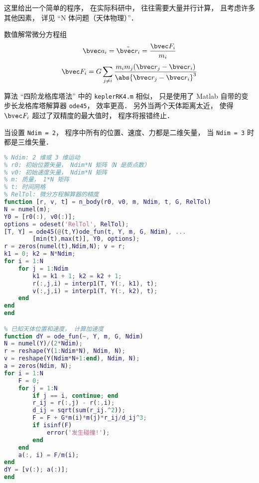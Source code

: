 
\begin{issues}
\issueDraft
\end{issues}


这里给出一个简单的程序， 在实际科研中， 往往需要大量并行计算， 且考虑许多其他因素， 详见 “N 体问题（天体物理）”．

数值解常微分方程组
\begin{equation}
\bvec a_i = \ddot{\bvec r_i} = \frac{\bvec F_i}{m_i}
\end{equation}
\begin{equation}
\bvec F_i = G\sum_{j\ne i} \frac{m_i m_j(\bvec r_j - \bvec r_i)}{\abs{\bvec r_j - \bvec r_i}^3}
\end{equation}

算法 “四阶龙格库塔法” 中的 \verb|keplerRK4.m| 相似， 只是使用了 Matlab 自带的变步长龙格库塔解算器 \verb|ode45|， 效率更高． 另外当两个天体距离太近， 使得 $\bvec F_i$ 超过了双精度的最大值时， 程序将报错终止．

当设置 \verb|Ndim = 2|， 程序中所有的位置、速度、力都是二维矢量， 当 \verb|Ndim = 3| 时都是三维矢量．


\begin{lstlisting}[language=matlab, caption=n\_body.m]
% N 体问题（支持二维或三维）
% Ndim: 2 维或 3 维运动
% r0: 初始位置矢量， Ndim*N 矩阵（N 是质点数）
% v0: 初始速度矢量， Ndim*N 矩阵
% m: 质量， 1*N 矩阵
% t: 时间网格
% RelTol: 微分方程解算器的精度
function [r, v, t] = n_body(r0, v0, m, Ndim, t, G, RelTol)
N = numel(m);
Y0 = [r0(:), v0(:)];
options = odeset('RelTol', RelTol);
[T, Y] = ode45(@(t,Y)ode_fun(t, Y, m, G, Ndim), ...
        [min(t),max(t)], Y0, options);
r = zeros(numel(t),Ndim,N); v = r;
k1 = 0; k2 = N*Ndim;
for i = 1:N
    for j = 1:Ndim
        k1 = k1 + 1; k2 = k2 + 1;
        r(:,j,i) = interp1(T, Y(:, k1), t);
        v(:,j,i) = interp1(T, Y(:, k2), t);
    end
end
end

% 已知天体位置和速度， 计算加速度
function dY = ode_fun(~, Y, m, G, Ndim)
N = numel(Y)/(2*Ndim);
r = reshape(Y(1:Ndim*N), Ndim, N);
v = reshape(Y(Ndim*N+1:end), Ndim, N);
a = zeros(Ndim, N);
for i = 1:N
    F = 0;
    for j = 1:N
        if j == i, continue; end
        r_ij = r(:,j) - r(:,i);
        d_ij = sqrt(sum(r_ij.^2));
        F = F + G*m(i)*m(j)*r_ij/d_ij^3;
        if isinf(F)
            error('发生碰撞!');
        end
    end
    a(:, i) = F/m(i);
end
dY = [v(:); a(:)];
end
\end{lstlisting}


